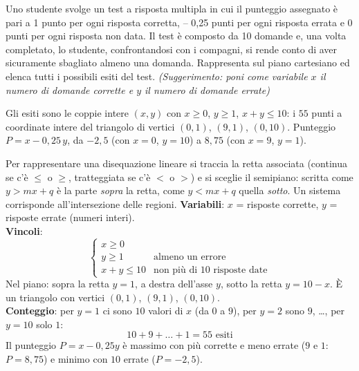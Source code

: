 \begin{question}[ID=2.1, subtitle={Punteggio di un test a risposta multipla}, tags={parti di piano}, difficulty=media]
Uno studente svolge un test a risposta multipla in cui il punteggio assegnato è pari a 1 punto per ogni risposta corretta, – 0,25 punti per ogni risposta errata e 0 punti per ogni risposta non data.
Il test è composto da 10 domande e, una volta completato, lo studente, confrontandosi con i compagni, si rende conto di aver sicuramente sbagliato almeno una domanda.
Rappresenta sul piano cartesiano ed elenca tutti i possibili esiti del test. \textit{(Suggerimento: poni come variabile $x$ il numero di domande corrette e $y$ il numero di domande errate)}
\begin{solution}
Gli esiti sono le coppie intere $(x,y)$ con $x\geq0$, $y\geq1$, $x+y\leq10$: i $55$ punti a coordinate intere del triangolo di vertici $(0,1)$, $(9,1)$, $(0,10)$. Punteggio $P=x-0{,}25\,y$, da $-2{,}5$ (con $x=0$, $y=10$) a $8{,}75$ (con $x=9$, $y=1$).
\end{solution}
\begin{explanation}
Per rappresentare una disequazione lineare si traccia la retta associata (continua se c'è $\leq$ o $\geq$, tratteggiata se c'è $<$ o $>$) e si sceglie il semipiano: scritta come $y>mx+q$ è la parte \emph{sopra} la retta, come $y<mx+q$ quella \emph{sotto}. Un sistema corrisponde all'intersezione delle regioni.
\textbf{Variabili}: $x$ = risposte corrette, $y$ = risposte errate (numeri interi). \\
\textbf{Vincoli}:
\[ \begin{cases} x\geq0\\ y\geq1 & \text{almeno un errore}\\ x+y\leq10 & \text{non più di 10 risposte date} \end{cases} \]
Nel piano: sopra la retta $y=1$, a destra dell'asse $y$, sotto la retta $y=10-x$. È un triangolo con vertici $(0,1)$, $(9,1)$, $(0,10)$. \\
\textbf{Conteggio}: per $y=1$ ci sono $10$ valori di $x$ (da $0$ a $9$), per $y=2$ sono $9$, \ldots, per $y=10$ solo $1$:
\[ 10+9+\dots+1=55 \text{ esiti} \]
Il punteggio $P=x-0{,}25y$ è massimo con più corrette e meno errate ($9$ e $1$: $P=8{,}75$) e minimo con $10$ errate ($P=-2{,}5$).
\end{explanation}
\end{question}

